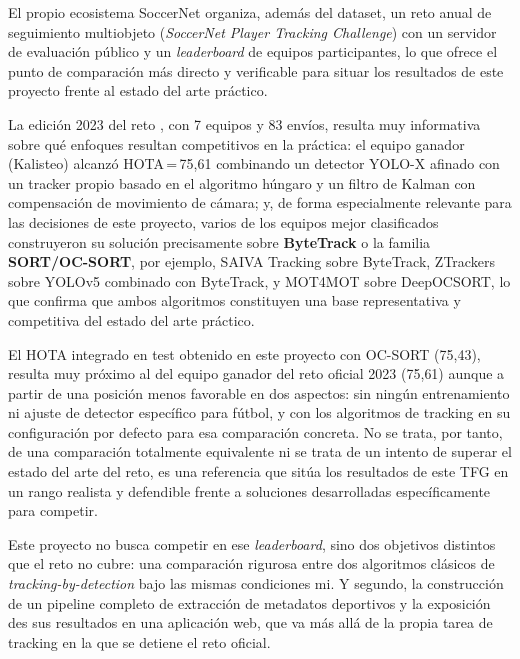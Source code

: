 El propio ecosistema SoccerNet organiza, además del dataset, un reto anual
de seguimiento multiobjeto (\emph{SoccerNet Player Tracking Challenge}) con
un servidor de evaluación público y un \emph{leaderboard} de equipos
participantes, lo que ofrece el punto de comparación más directo y
verificable para situar los resultados de este proyecto frente al estado
del arte práctico.

La edición 2023 del reto \citep{cioppa2023soccernetchallenges}, con 7 equipos
y 83 envíos, resulta muy informativa sobre qué enfoques resultan
competitivos en la práctica: el equipo ganador (Kalisteo) alcanzó
HOTA\,=\,75{,}61 combinando un detector YOLO-X afinado con un tracker
propio basado en el algoritmo húngaro
y un filtro de Kalman con compensación de movimiento de cámara; y, de forma especialmente
relevante para las decisiones de este proyecto, varios de los equipos
mejor clasificados construyeron su solución precisamente sobre
\textbf{ByteTrack} o la familia \textbf{SORT/OC-SORT}, por ejemplo, SAIVA Tracking
sobre ByteTrack, ZTrackers sobre YOLOv5 combinado con ByteTrack, y
MOT4MOT sobre DeepOCSORT, lo que confirma que ambos algoritmos
constituyen una base representativa y competitiva del estado del arte
práctico.

El HOTA integrado en test obtenido en este proyecto
con OC-SORT (75{,}43), resulta muy próximo al del equipo ganador del
reto oficial 2023 (75{,}61) aunque a partir de una posición menos favorable
en dos aspectos: sin ningún entrenamiento ni ajuste de detector
específico para fútbol, y con los algoritmos de tracking en su
configuración por defecto para esa comparación concreta. No se trata, por
tanto, de una comparación totalmente equivalente ni se trata de un intento
de superar el estado del arte del reto, es una referencia
que sitúa los resultados de este TFG en un rango realista y defendible
frente a soluciones desarrolladas específicamente para competir.

Este proyecto no busca competir en ese \emph{leaderboard}, sino dos objetivos distintos que
el reto no cubre: una comparación rigurosa entre dos algoritmos clásicos de
\emph{tracking-by-detection} bajo las mismas condiciones mi. Y segundo, la construcción de un pipeline
completo de extracción de metadatos deportivos y la
exposición des sus resultados en una aplicación web, que va
más allá de la propia tarea de tracking en la que se detiene el reto
oficial.

